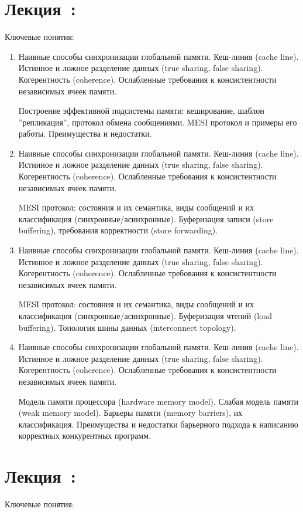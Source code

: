 \documentclass[a4paper, 12pt]{extarticle}
\begin{document}
\newcommand{\globMemOverview}{Наивные способы синхронизации глобальной памяти. Кеш-линия (cache line). Истинное и ложное разделение данных (true sharing, false sharing). Когерентность (coherence). 
Ослабленные требования к консистентности независимых ячеек памяти. }


\section{Лекция~\cacheCoherencyNum: \cacheCoherencyTopic}

Ключевые понятия: \cacheCoherencyKey

\begin{enumerate}[\thesection .1]
	\item \globMemOverview	

	Построение эффективной подсистемы памяти: кеширование, шаблон ''репликация'', протокол обмена сообщениями. MESI протокол и примеры его работы. Преимущества и недостатки. 

	\item \globMemOverview 

	MESI протокол: состояния и их семантика, виды сообщений и их классификация (синхронные/асинхронные). Буферизация записи (store buffering), требования корректности (store forwarding).

	\item \globMemOverview 
	
	MESI протокол: состояния и их семантика, виды сообщений и их классификация (синхронные/асинхронные). Буферизация чтений (load buffering). Топология шины данных (interconnect topology).

	\item \globMemOverview 

	Модель памяти процессора (hardware memory model). Слабая модель памяти (weak memory model). Барьеры памяти (memory barriers), их классификация. Преимущества и недостатки барьерного подхода к написанию корректных конкурентных программ.	

\end{enumerate}


\newcommand{\langMM}{Модель памяти языка программирования (language memory model). Мотивация, цели, сложности при написании.}


\section{Лекция~\langMMNum: \langMMTopic}

Ключевые понятия: \langMMKey
\end{document}
